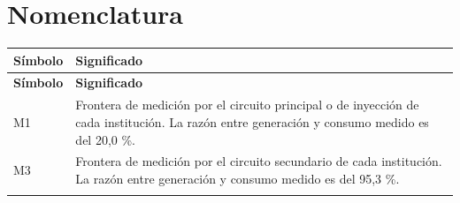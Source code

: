 \thispagestyle{indexpage}
\vspace*{1cm}
\section*{\Huge\textbf{Nomenclatura}}
\justifying

\begin{longtable}{@{}>{\raggedright\arraybackslash}p{}>{\raggedright\arraybackslash}p{}@{}}
\toprule
\textbf{Símbolo} & \textbf{Significado} \\
\midrule
\endfirsthead
\toprule
\textbf{Símbolo} & \textbf{Significado} \\
\midrule
\endhead
\bottomrule
\endfoot
\bottomrule
\endlastfoot
M1 & Frontera de medición por el circuito principal o de inyección de
cada institución. La razón entre generación y consumo medido es del
20,0 \%. \\
\addlinespace
M3 & Frontera de medición por el circuito secundario de cada
institución. La razón entre generación y consumo medido es del 95,3 \%. \\
\addlinespace
\end{longtable}
